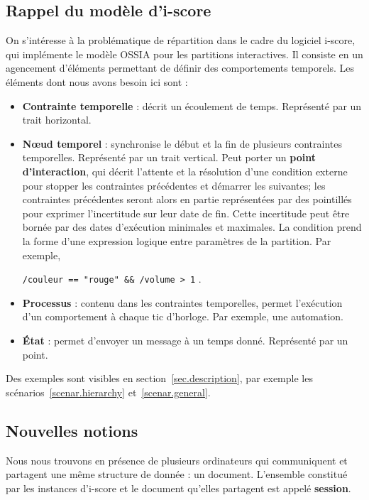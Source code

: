 \documentclass{article}
\newcommand\ossia{OSSIA\xspace}
\newcommand\vocab[1]{\textbf{#1}}
\begin{document}
\subsection{Rappel du modèle d'i-score}
On s'intéresse à la problématique de répartition dans le cadre du logiciel i-score, qui implémente le modèle \ossia\cite{celerier2015ossia} pour les partitions interactives.
Il consiste en un agencement d'éléments permettant de définir des comportements temporels. 
Les éléments dont nous avons besoin ici sont : 
\begin{itemize}
	\item \vocab{Contrainte temporelle} : décrit un écoulement de temps. 
    Représenté par un trait horizontal. 
	\item \vocab{Nœud temporel} : synchronise le début et la fin de plusieurs contraintes temporelles. Représenté par un trait vertical.
	Peut porter un \vocab{point d'interaction}, qui décrit l'attente et la résolution d'une condition externe pour stopper les contraintes précédentes et démarrer les suivantes; les contraintes précédentes seront alors en partie représentées par des pointillés pour exprimer l'incertitude sur leur date de fin. 
    Cette incertitude peut être bornée par des dates d'exécution minimales et maximales.
    La condition prend la forme d'une expression logique entre paramètres de la partition. Par exemple, 
    
    \lstinline|/couleur == "rouge" && /volume > 1| .
	\item \vocab{Processus} : contenu dans les contraintes temporelles, permet l'exécution d'un comportement à chaque tic d'horloge. Par exemple, une automation.
	\item \vocab{État} : permet d'envoyer un message à un temps donné. Représenté par un point.
\end{itemize}
Des exemples sont visibles en section~\ref{sec.description}, par exemple les scénarios~\ref{scenar.hierarchy} et~\ref{scenar.general}.

\subsection{Nouvelles notions}
Nous nous trouvons en présence de plusieurs ordinateurs qui communiquent et partagent une même structure de donnée : un document.
L'ensemble constitué par les instances d'i-score et le document qu'elles partagent est appelé \vocab{session}.
\end{document}
